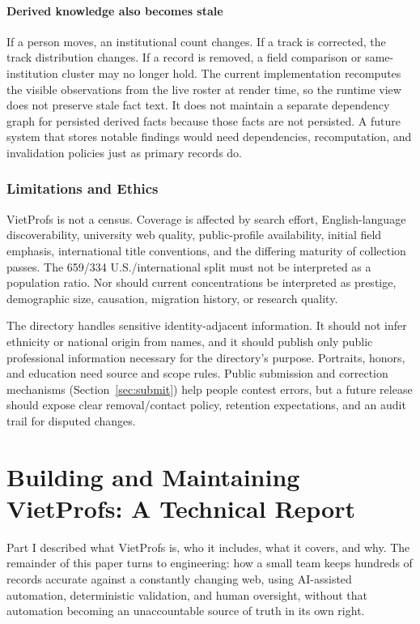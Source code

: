 \documentclass[11pt]{article}
\begin{document}
\subsection{Derived knowledge also becomes stale}
If a person moves, an institutional count changes.
If a track is corrected, the track distribution changes.
If a record is removed, a field comparison or same-institution cluster may no longer hold.
The current implementation recomputes the visible observations from the live roster at render time, so the runtime view does not preserve stale fact text.
It does not maintain a separate dependency graph for persisted derived facts because those facts are not persisted.
A future system that stores notable findings would need dependencies, recomputation, and invalidation policies just as primary records do.

\section{Limitations and Ethics}
\label{sec:limitations}
VietProfs is not a census.
Coverage is affected by search effort, English-language discoverability, university web quality, public-profile availability, initial field emphasis, international title conventions, and the differing maturity of collection passes.
The 659/334 U.S./international split must not be interpreted as a population ratio.
Nor should current concentrations be interpreted as prestige, demographic size, causation, migration history, or research quality.

The directory handles sensitive identity-adjacent information.
It should not infer ethnicity or national origin from names, and it should publish only public professional information necessary for the directory's purpose.
Portraits, honors, and education need source and scope rules.
Public submission and correction mechanisms (Section~\ref{sec:submit}) help people contest errors, but a future release should expose clear removal/contact policy, retention expectations, and an audit trail for disputed changes.

\part{Building and Maintaining VietProfs: A Technical Report}

Part I described what VietProfs is, who it includes, what it covers, and why.
The remainder of this paper turns to engineering: how a small team keeps hundreds of records accurate against a constantly changing web, using AI-assisted automation, deterministic validation, and human oversight, without that automation becoming an unaccountable source of truth in its own right.
\end{document}
